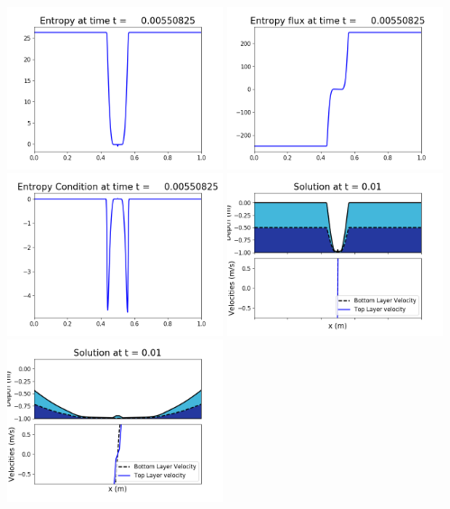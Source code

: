 \documentclass[11pt]{article}
\begin{document}
\vskip 10pt 
\includegraphics[width=0.475\textwidth]{frame0035fig1007.png}
\includegraphics[width=0.475\textwidth]{frame0035fig1008.png}
\vskip 10pt 
\includegraphics[width=0.475\textwidth]{frame0035fig1009.png}
\vskip 10pt 
\includegraphics[width=0.475\textwidth]{frame0036fig1001.png}
\includegraphics[width=0.475\textwidth]{frame0036fig1002.png}
\end{document}
